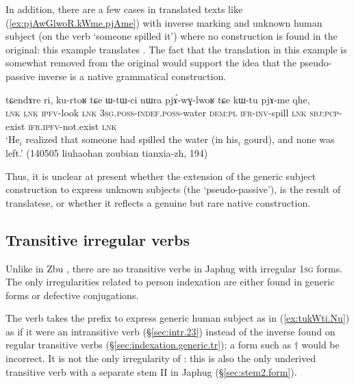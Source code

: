 In addition, there are a few cases in translated texts like (\ref{ex:pjAwGlwoR.kWme.pjAme}) with inverse marking and unknown human subject (on the verb  `someone spilled it') where no   construction is found in the original: this example translates . The fact that the translation in this example is somewhat removed from the original would support the idea that the pseudo-passive inverse is a native grammatical construction.

\begin{exe}
\ex \label{ex:pjAwGlwoR.kWme.pjAme}
\gll  tɕendɤre ri, ku-rtoʁ tɕe ɯ-tɯ-ci nɯra pjɤ́-wɣ-lwoʁ tɕe kɯ-tu pjɤ-me qhe,  \\
\textsc{lnk} \textsc{lnk} \textsc{ipfv}-look \textsc{lnk} \textsc{3sg}.\textsc{poss}-\textsc{indef}.\textsc{poss}-water \textsc{dem}:\textsc{pl} \textsc{ifr}-\textsc{inv}-spill \textsc{lnk} \textsc{sbj}:\textsc{pcp}-exist \textsc{ifr}.\textsc{ipfv}-not.exist \textsc{lnk} \\
\glt `He$_i$ realized that someone had spilled the water (in his$_i$ gourd), and none was left.' (140505 liuhaohan zoubian tianxia-zh, 194)
\end{exe}

Thus, it is unclear at present whether the extension of the generic subject construction to express unknown subjects (the `pseudo-passive'), is the result of translatese, or whether it reflects a genuine but rare native construction.

\subsection{Transitive irregular verbs} \label{sec:irregular.transitive}
Unlike in Zbu \citep{gongxun14agreement}, there are no transitive verbs in Japhug with irregular \textsc{1sg} forms. The only irregularities related to person indexation are either found in generic forms or defective conjugations.

The verb  takes the prefix  to express generic human subject as in (\ref{ex:tukWti.Nu}) as if it were an intransitive verb (§\ref{sec:intr.23}) instead of the inverse  found on regular transitive verbs (§\ref{sec:indexation.generic.tr}); a form such as $\dagger$ would be incorrect. It is not the only irregularity of  : this is also the only underived transitive verb with a separate stem II in Japhug (§\ref{sec:stem2.form}).


